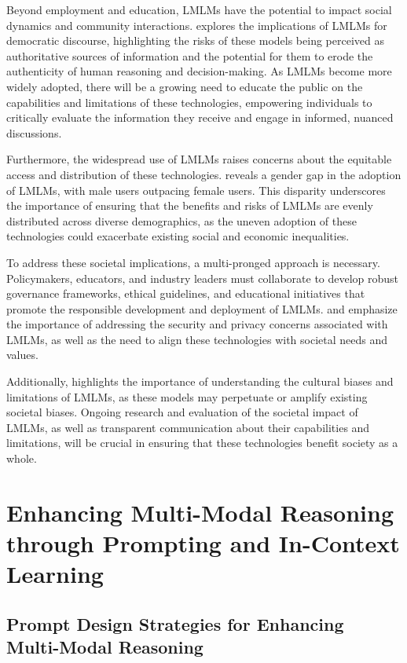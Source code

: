 \documentclass[11pt]{article}
\begin{document}
Beyond employment and education, LMLMs have the potential to impact social dynamics and community interactions. \cite{ref89} explores the implications of LMLMs for democratic discourse, highlighting the risks of these models being perceived as authoritative sources of information and the potential for them to erode the authenticity of human reasoning and decision-making. As LMLMs become more widely adopted, there will be a growing need to educate the public on the capabilities and limitations of these technologies, empowering individuals to critically evaluate the information they receive and engage in informed, nuanced discussions.

Furthermore, the widespread use of LMLMs raises concerns about the equitable access and distribution of these technologies. \cite{ref288} reveals a gender gap in the adoption of LMLMs, with male users outpacing female users. This disparity underscores the importance of ensuring that the benefits and risks of LMLMs are evenly distributed across diverse demographics, as the uneven adoption of these technologies could exacerbate existing social and economic inequalities.

To address these societal implications, a multi-pronged approach is necessary. Policymakers, educators, and industry leaders must collaborate to develop robust governance frameworks, ethical guidelines, and educational initiatives that promote the responsible development and deployment of LMLMs. \cite{ref105} and \cite{ref173} emphasize the importance of addressing the security and privacy concerns associated with LMLMs, as well as the need to align these technologies with societal needs and values.

Additionally, \cite{ref289} highlights the importance of understanding the cultural biases and limitations of LMLMs, as these models may perpetuate or amplify existing societal biases. Ongoing research and evaluation of the societal impact of LMLMs, as well as transparent communication about their capabilities and limitations, will be crucial in ensuring that these technologies benefit society as a whole.

\section{Enhancing Multi-Modal Reasoning through Prompting and In-Context Learning}

\subsection{Prompt Design Strategies for Enhancing Multi-Modal Reasoning}
\end{document}
